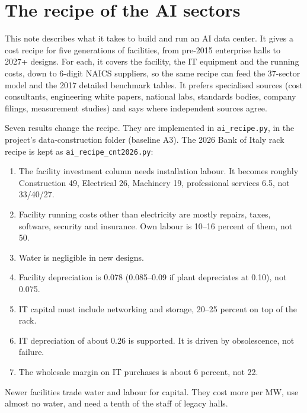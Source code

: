 
\section{The recipe of the AI sectors}\label{sec:recipe}
This note describes what it takes to build and run an AI data center. It gives a cost
recipe for five generations of facilities, from pre-2015 enterprise halls to 2027+ designs. For
each, it covers the facility, the IT equipment and the running costs, down to 6-digit NAICS
suppliers, so the same recipe can feed the 37-sector model and the 2017 detailed benchmark
tables. It prefers specialised sources (cost consultants, engineering white papers, national
labs, standards bodies, company filings, measurement studies) and says where independent sources
agree.

Seven results change the recipe. They are implemented in \texttt{ai\_recipe.py}, in the project's data-construction folder (baseline A3). The 2026 Bank of Italy rack recipe is kept as \texttt{ai\_recipe\_cnt2026.py}:
\begin{enumerate}
  \item The facility investment column needs installation labour. It becomes roughly
    Construction 49, Electrical 26, Machinery 19, professional services 6.5, not 33/40/27.
  \item Facility running costs other than electricity are mostly repairs, taxes, software,
    security and insurance. Own labour is 10--16 percent of them, not 50.
  \item Water is negligible in new designs.
  \item Facility depreciation is 0.078 (0.085--0.09 if plant depreciates at 0.10), not 0.075.
  \item IT capital must include networking and storage, 20--25 percent on top of the rack.
  \item IT depreciation of about 0.26 is supported. It is driven by obsolescence, not failure.
  \item The wholesale margin on IT purchases is about 6 percent, not 22.
\end{enumerate}
Newer facilities trade water and labour for capital. They cost more per MW, use almost no water,
and need a tenth of the staff of legacy halls.


